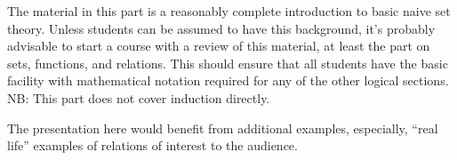 \documentclass[../../include/open-logic-part]{subfiles}
\begin{document}

\begin{editorial}
  The material in this part is a reasonably complete introduction to
  basic naive set theory. Unless students can be assumed to have this
  background, it's probably advisable to start a course with a review
  of this material, at least the part on sets, functions, and
  relations. This should ensure that all students have the basic
  facility with mathematical notation required for any of the other
  logical sections. NB: This part does not cover induction directly.

  The presentation here would benefit from additional examples,
  especially, ``real life'' examples of relations of interest to the
  audience.
\end{editorial}





\OLEndPartHook
\end{document}
